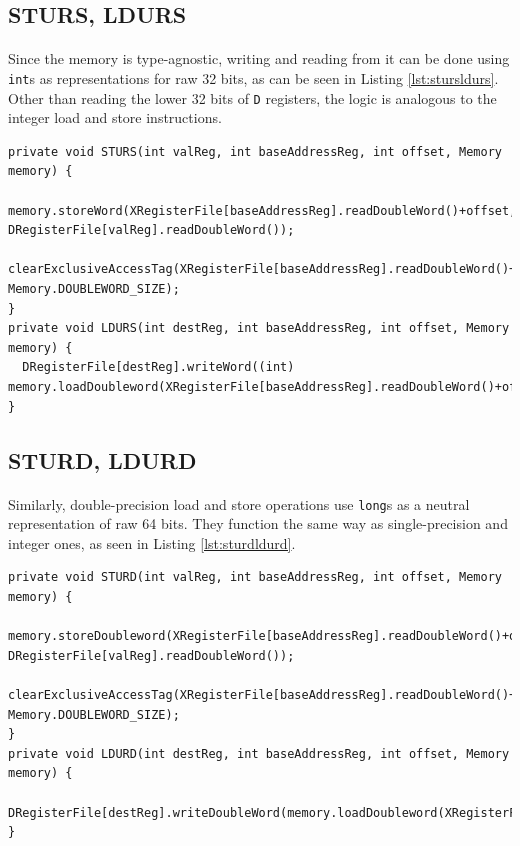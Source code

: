 \subsection{STURS, LDURS}
\paragraph{}
Since the memory is type-agnostic, writing and reading from it can be done using \verb|int|s as representations for raw 32 bits, as can be seen in Listing \ref{lst:stursldurs}. Other than reading the lower 32 bits of \verb|D| registers, the logic is analogous to the integer load and store instructions.
\begin{lstlisting}[float, caption={Single-precision load and store instructions}, label={lst:stursldurs}]
private void STURS(int valReg, int baseAddressReg, int offset, Memory memory) {
  memory.storeWord(XRegisterFile[baseAddressReg].readDoubleWord()+offset, DRegisterFile[valReg].readDoubleWord());
  clearExclusiveAccessTag(XRegisterFile[baseAddressReg].readDoubleWord()+offset, Memory.DOUBLEWORD_SIZE);
}
private void LDURS(int destReg, int baseAddressReg, int offset, Memory memory) {
  DRegisterFile[destReg].writeWord((int) memory.loadDoubleword(XRegisterFile[baseAddressReg].readDoubleWord()+offset));
}
\end{lstlisting}
\subsection{STURD, LDURD}
\paragraph{}
Similarly, double-precision load and store operations use \verb|long|s as a neutral representation of raw 64 bits. They function the same way as single-precision and integer ones, as seen in Listing \ref{lst:sturdldurd}.
\begin{lstlisting}[float, caption={Double-precision load and store instructions}, label={lst:sturdldurd}]
private void STURD(int valReg, int baseAddressReg, int offset, Memory memory) {		 
  memory.storeDoubleword(XRegisterFile[baseAddressReg].readDoubleWord()+offset, DRegisterFile[valReg].readDoubleWord());
  clearExclusiveAccessTag(XRegisterFile[baseAddressReg].readDoubleWord()+offset, Memory.DOUBLEWORD_SIZE);
}
private void LDURD(int destReg, int baseAddressReg, int offset, Memory memory) {
  DRegisterFile[destReg].writeDoubleWord(memory.loadDoubleword(XRegisterFile[baseAddressReg].readDoubleWord()+offset));
}
\end{lstlisting}

